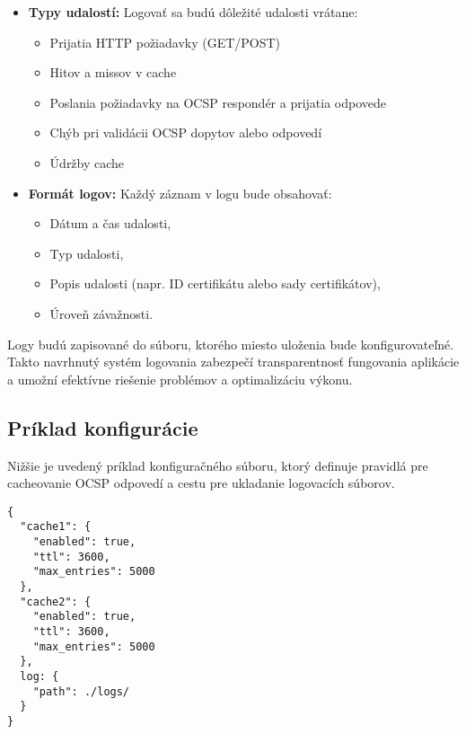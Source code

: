 \documentclass[12pt, twoside]{book}
\begin{document}
\begin{itemize}
    \item \textbf{Typy udalostí:}  
    Logovať sa budú dôležité udalosti vrátane:
    \begin{itemize}
        \item Prijatia HTTP požiadavky (GET/POST)
        \item Hitov a missov v cache
        \item Poslania požiadavky na OCSP respondér a prijatia odpovede
        \item Chýb pri validácii OCSP dopytov alebo odpovedí
        \item Údržby cache
    \end{itemize}

    \item \textbf{Formát logov:}  
    Každý záznam v logu bude obsahovať:
    \begin{itemize}
        \item Dátum a čas udalosti,
        \item Typ udalosti,
        \item Popis udalosti (napr. ID certifikátu alebo sady certifikátov),
        \item Úroveň závažnosti.
    \end{itemize}
\end{itemize}

Logy budú zapisované do súboru, ktorého miesto uloženia bude konfigurovateľné. Takto navrhnutý systém logovania zabezpečí transparentnosť fungovania aplikácie a umožní efektívne riešenie problémov a optimalizáciu výkonu.



\subsection{Príklad konfigurácie}
Nižšie je uvedený príklad konfiguračného súboru, ktorý definuje pravidlá pre cacheovanie OCSP odpovedí a cestu pre ukladanie logovacích súborov.
\begin{verbatim}
{
  "cache1": {
    "enabled": true,
    "ttl": 3600,
    "max_entries": 5000
  },
  "cache2": {
    "enabled": true,
    "ttl": 3600,
    "max_entries": 5000
  },
  log: {
    "path": ./logs/
  }
}
\end{verbatim}
\end{document}
